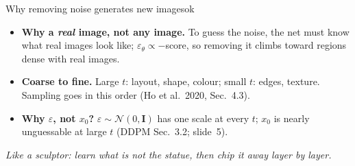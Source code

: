 \documentclass[aspectratio=169,9pt,xcolor=table]{beamer}
\newcommand{\Normal}{\mathcal{N}}
\newcommand{\Id}{\mathbf{I}}
\newcommand{\eps}{\varepsilon}
\begin{document}
\begin{frame}
\begin{columns}[T,onlytextwidth]
\begin{tbox}[fontupper=\footnotesize,before skip=0pt,after skip=0pt]{Why removing noise generates new images}{ok}
\begin{itemize}
\item \textbf{Why a \emph{real} image, not any image.} To guess the noise, the net must know what real images look like; $\eps_\theta\propto-$score, so removing it climbs toward regions dense with real images.
\item \textbf{Coarse to fine.} Large $t$: layout, shape, colour; small $t$: edges, texture. Sampling goes in this order (Ho et al.\ 2020, Sec.~4.3).
\item \textbf{Why $\eps$, not $x_0$?} $\eps\sim\Normal(0,\Id)$ has one scale at every $t$; $x_0$ is nearly unguessable at large $t$ (DDPM Sec.~3.2; slide~5).
\end{itemize}
\vspace{0.5mm}
{\color{ok!70!black}\itshape Like a sculptor: learn what is \emph{not} the statue, then chip it away layer by layer.}
\end{tbox}
\end{columns}
\end{frame}
\end{document}
